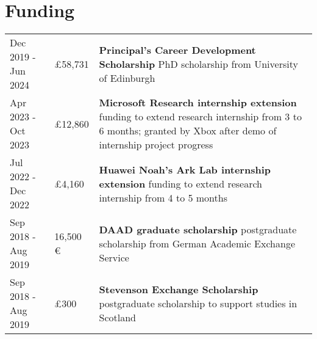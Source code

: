 \documentclass[a4paper,12pt]{article}
\begin{document}
\section{Funding}

\begin{tabularx}{\linewidth}{@{}l l X@{}}
    Dec 2019 - Jun 2024 & \pounds 58,731 & \textbf{Principal's Career Development Scholarship} \newline PhD scholarship from University of Edinburgh \\
    Apr 2023 - Oct 2023 & \pounds 12,860 & \textbf{Microsoft Research internship extension} \newline funding to extend research internship from 3 to 6 months; granted by Xbox after demo of internship project progress\\
    Jul 2022 - Dec 2022 & \pounds 4,160 & \textbf{Huawei Noah's Ark Lab internship extension} \newline funding to extend research internship from 4 to 5 months\\
    Sep 2018 - Aug 2019 & 16,500 \euro & \textbf{DAAD graduate scholarship} \newline postgraduate scholarship from German Academic Exchange Service\\
    Sep 2018 - Aug 2019 & \pounds 300 & \textbf{Stevenson Exchange Scholarship} \newline postgraduate scholarship to support studies in Scotland
\end{tabularx}

\end{document}

